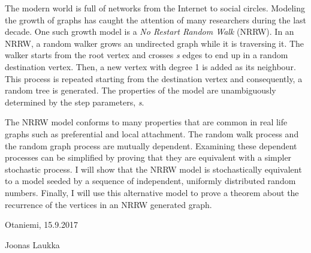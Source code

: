 \documentclass[finnish, 12pt, a4paper, sci, utf8, pdfa]{aaltothesis}
\begin{document}
\newpage
\begin{abstractpage}[english]
The modern world is full of networks from the Internet to social circles. Modeling the growth
of graphs has caught the attention of many researchers during the last decade. One such growth model
is a \textit{No Restart Random Walk} (NRRW). In an NRRW, a random walker grows
an undirected graph while it is traversing it. The walker starts from the root vertex and crosses \textit{s}
edges to end up in a random destination vertex. Then, a new vertex with degree 1 is added as its neighbour. 
This process is repeated starting from the destination vertex and consequently, a random tree is generated. 
The properties of the model are unambiguously determined by the step parameters, \textit{s}.

The NRRW model conforms to many properties that are common in real life graphs such as
preferential and local attachment. The random walk process and the random graph process are
mutually dependent. Examining these dependent processes can be simplified by proving that they
are equivalent with a simpler stochastic process. I will show that the NRRW model is stochastically
equivalent to a model seeded by a sequence of independent, uniformly distributed random numbers. Finally, I
will use this alternative model to prove a theorem about the recurrence of the vertices in an NRRW 
generated graph.
\end{abstractpage}

\newpage



\vspace{5cm}
Otaniemi, 15.9.2017

\vspace{5mm}
{\hfill Joonas Laukka \hspace{1cm}}

\newpage
\end{document}
